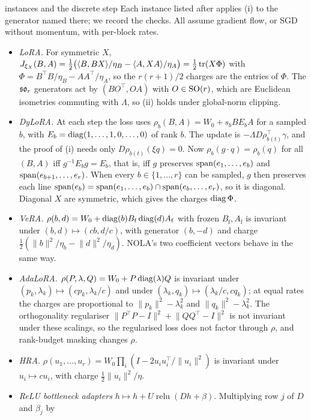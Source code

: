 \begin{remark*}{instances and the discrete step}
Each instance listed after  applies (i) to the generator named there; we record the checks. All
assume gradient flow, or SGD without momentum, with per-block rates.
\begin{itemize}
\item \emph{LoRA.} For symmetric $X$, $J_{\xi_X}(B,A)=\tfrac12\big(\langle B,BX\rangle/\eta_B-\langle A,XA\rangle/\eta_A\big)=\tfrac12\operatorname{tr}(X\Phi)$
with $\Phi=B^\top B/\eta_B-AA^\top/\eta_A$, so the $r(r+1)/2$ charges are the entries of $\Phi$. The $\mathfrak{so}_r$ generators
act by $(BO^\top,OA)$ with $O\in\mathrm{SO}(r)$, which are Euclidean isometries commuting with $\Lambda$, so (ii) holds under
global-norm clipping.
\item \emph{DyLoRA.} At each step the loss uses $\rho_b(B,A)=W_0+s_bBE_bA$ for a sampled $b$, with
$E_b=\operatorname{diag}(1,\dots,1,0,\dots,0)$ of rank $b$. The update is $-\Lambda D\rho_{b(t)}^\top\gamma$, and the proof of (i) needs
only $D\rho_{b(t)}(\xi q)=0$. Now $\rho_b(g\cdot q)=\rho_b(q)$ for all $(B,A)$ iff $g^{-1}E_bg=E_b$, that is, iff
$g$ preserves $\operatorname{span}(e_1,\dots,e_b)$ and $\operatorname{span}(e_{b+1},\dots,e_r)$. When every $b\in\{1,\dots,r\}$ can be sampled,
$g$ then preserves each line $\operatorname{span}(e_b)=\operatorname{span}(e_1,\dots,e_b)\cap\operatorname{span}(e_b,\dots,e_r)$, so it is diagonal. Diagonal $X$ are symmetric, which gives the charges $\operatorname{diag}\Phi$.
\item \emph{VeRA.} $\rho(b,d)=W_0+\operatorname{diag}(b)B_{\mathrm f}\operatorname{diag}(d)A_{\mathrm f}$ with frozen $B_{\mathrm f},A_{\mathrm f}$ is
invariant under $(b,d)\mapsto(cb,d/c)$, with generator $(b,-d)$ and charge $\tfrac12(\lVert b\rVert^2/\eta_b-\lVert d\rVert^2/\eta_d)$.
NOLA's two coefficient vectors behave in the same way.
\item \emph{AdaLoRA.} $\rho(P,\lambda,Q)=W_0+P\operatorname{diag}(\lambda)Q$ is invariant under $(p_k,\lambda_k)\mapsto(cp_k,\lambda_k/c)$ and
under $(\lambda_k,q_k)\mapsto(\lambda_k/c,cq_k)$; at equal rates the charges are proportional to
$\lVert p_k\rVert^2-\lambda_k^2$ and $\lVert q_k\rVert^2-\lambda_k^2$. The orthogonality regulariser
$\lVert P^\top P-I\rVert^2+\lVert QQ^\top-I\rVert^2$ is not invariant under these scalings, so the regularised loss does not
factor through $\rho$, and rank-budget masking changes $\rho$.
\item \emph{HRA.} $\rho(u_1,\dots,u_r)=W_0\prod_i(I-2u_iu_i^\top/\lVert u_i\rVert^2)$ is invariant under $u_i\mapsto cu_i$,
with charge $\tfrac12\lVert u_i\rVert^2/\eta$.
\item \emph{ReLU bottleneck adapters} $h\mapsto h+U\operatorname{relu}(Dh+\beta)$. Multiplying row $j$ of $D$ and $\beta_j$ by

\end{itemize}
\end{remark*}
